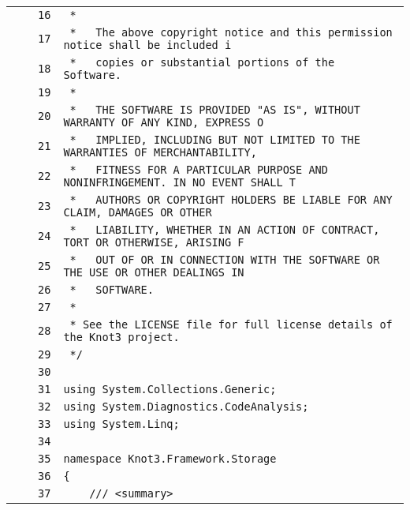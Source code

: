 \documentclass[a4paper,10pt]{article}
\begin{document}
\begin{longtable}[l]{lrrl}
\cellcolor{gray} &  & \verb~16~ & \verb~ *~\\
\cellcolor{gray} &  & \verb~17~ & \verb~ *   The above copyright notice and this permission notice shall be included i~\\
\cellcolor{gray} &  & \verb~18~ & \verb~ *   copies or substantial portions of the Software.~\\
\cellcolor{gray} &  & \verb~19~ & \verb~ *~\\
\cellcolor{gray} &  & \verb~20~ & \verb~ *   THE SOFTWARE IS PROVIDED "AS IS", WITHOUT WARRANTY OF ANY KIND, EXPRESS O~\\
\cellcolor{gray} &  & \verb~21~ & \verb~ *   IMPLIED, INCLUDING BUT NOT LIMITED TO THE WARRANTIES OF MERCHANTABILITY,~\\
\cellcolor{gray} &  & \verb~22~ & \verb~ *   FITNESS FOR A PARTICULAR PURPOSE AND NONINFRINGEMENT. IN NO EVENT SHALL T~\\
\cellcolor{gray} &  & \verb~23~ & \verb~ *   AUTHORS OR COPYRIGHT HOLDERS BE LIABLE FOR ANY CLAIM, DAMAGES OR OTHER~\\
\cellcolor{gray} &  & \verb~24~ & \verb~ *   LIABILITY, WHETHER IN AN ACTION OF CONTRACT, TORT OR OTHERWISE, ARISING F~\\
\cellcolor{gray} &  & \verb~25~ & \verb~ *   OUT OF OR IN CONNECTION WITH THE SOFTWARE OR THE USE OR OTHER DEALINGS IN~\\
\cellcolor{gray} &  & \verb~26~ & \verb~ *   SOFTWARE.~\\
\cellcolor{gray} &  & \verb~27~ & \verb~ *~\\
\cellcolor{gray} &  & \verb~28~ & \verb~ * See the LICENSE file for full license details of the Knot3 project.~\\
\cellcolor{gray} &  & \verb~29~ & \verb~ */~\\
\cellcolor{gray} &  & \verb~30~ & \verb~~\\
\cellcolor{gray} &  & \verb~31~ & \verb~using System.Collections.Generic;~\\
\cellcolor{gray} &  & \verb~32~ & \verb~using System.Diagnostics.CodeAnalysis;~\\
\cellcolor{gray} &  & \verb~33~ & \verb~using System.Linq;~\\
\cellcolor{gray} &  & \verb~34~ & \verb~~\\
\cellcolor{gray} &  & \verb~35~ & \verb~namespace Knot3.Framework.Storage~\\
\cellcolor{gray} &  & \verb~36~ & \verb~{~\\
\cellcolor{gray} &  & \verb~37~ & \verb~    /// <summary>~\\

\end{longtable}
\end{document}
